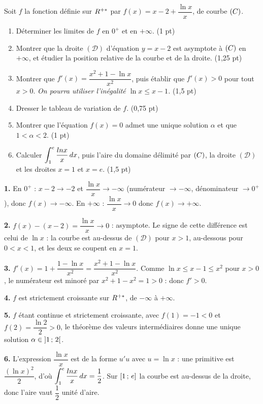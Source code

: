 \begin{commeaubac}
Soit $f$ la fonction définie sur $R^{+*}$ par
$f(x) = x - 2 + \dfrac{\ln x}{x}$, de courbe $(C)$.

\begin{enumerate}[label=\textbf{\arabic*.}, leftmargin=*, itemsep=0.25em]
  \item Déterminer les limites de $f$ en $0^{+}$ et en $+\infty$.
        \hfill\textup{(1 pt)}
  \item Montrer que la droite $(\mathscr{D})$ d'équation $y = x-2$ est
        asymptote à $(C)$ en $+\infty$, et étudier la position relative de la
        courbe et de la droite. \hfill\textup{(1,25 pt)}
  \item Montrer que $f'(x) = \dfrac{x^{2}+1-\ln x}{x^{2}}$, puis établir que
        $f'(x)>0$ pour tout $x>0$. \emph{On pourra utiliser l'inégalité
        $\ln x \leq x-1$.} \hfill\textup{(1,5 pt)}
  \item Dresser le tableau de variation de $f$. \hfill\textup{(0,75 pt)}
  \item Montrer que l'équation $f(x)=0$ admet une unique solution $\alpha$ et
        que $1 < \alpha < 2$. \hfill\textup{(1 pt)}
  \item Calculer $\displaystyle\int_{1}^{e} \frac{ln x}{x}\,dx$, puis l'aire du
        domaine délimité par $(C)$, la droite $(\mathscr{D})$ et les droites
        $x=1$ et $x=e$. \hfill\textup{(1,5 pt)}
\end{enumerate}
\end{commeaubac}

\begin{corrige}
\textbf{1.} En $0^{+}$ : $x-2 \to -2$ et $\dfrac{\ln x}{x} \to -\infty$
(numérateur $\to-\infty$, dénominateur $\to 0^{+}$), donc $f(x) \to -\infty$.
En $+\infty$ : $\dfrac{\ln x}{x} \to 0$ donc $f(x) \to +\infty$.

\textbf{2.} $f(x)-(x-2) = \dfrac{\ln x}{x} \to 0$ : asymptote. Le signe de
cette différence est celui de $\ln x$ : la courbe est au-dessus de
$(\mathscr{D})$ pour $x>1$, au-dessous pour $0<x<1$, et les deux se coupent
en $x=1$.

\textbf{3.} $f'(x) = 1 + \dfrac{1-\ln x}{x^{2}} = \dfrac{x^{2}+1-\ln x}{x^{2}}$.
Comme $\ln x \leq x-1 \leq x^{2}$ pour $x>0$, le numérateur est minoré par
$x^{2}+1-x^{2} = 1 > 0$ : donc $f'>0$.

\textbf{4.} $f$ est strictement croissante sur $R^{+*}$, de $-\infty$ à $+\infty$.

\textbf{5.} $f$ étant continue et strictement croissante, avec $f(1) = -1 < 0$
et $f(2) = \dfrac{\ln 2}{2} > 0$, le théorème des valeurs intermédiaires donne
une unique solution $\alpha \in \left]1\,;\,2\right[$.

\textbf{6.} L'expression $\dfrac{\ln x}{x}$ est de la forme $u'u$ avec
$u = \ln x$ : une primitive est $\dfrac{(\ln x)^{2}}{2}$, d'où
$\displaystyle\int_{1}^{e}\frac{ln x}{x}\,dx = \frac12$. Sur
$\left[1\,;\,e\right]$ la courbe est au-dessus de la droite, donc l'aire vaut
$\dfrac12$ unité d'aire.
\end{corrige}

